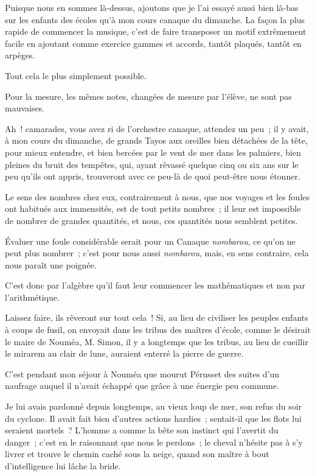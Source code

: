 \documentclass[french,twoside]{book} %
\begin{document}
Puisque nous en sommes là-dessus, ajoutons que je l’ai essayé aussi bien là-bas sur les enfants des écoles qu’à mon cours canaque du dimanche. La façon la plus rapide de commencer la musique, c’est de faire transposer un motif extrêmement facile en ajoutant comme exercice gammes et accords, tantôt plaqués, tantôt en arpèges.\par
Tout cela le plus simplement possible.\par
Pour la mesure, les mêmes notes, changées de mesure par l’élève, ne sont pas mauvaises.\par
Ah ! camarades, vous avez ri de l’orchestre canaque, attendez un peu ; il y avait, à mon cours du dimanche, de grands Tayos aux oreilles bien détachées de la tête, pour mieux entendre, et bien bercées par le vent de mer dans les palmiers, bien pleines du bruit des tempêtes, qui, ayant rêvassé quelque cinq ou six ans sur le peu qu’ils ont appris, trouveront avec ce peu-là de quoi peut-être nous étonner.\par
Le sens des nombres chez eux, contrairement à nous, que nos voyages et les foules ont habitués aux immensités, est de tout petits nombres ; il  leur est impossible de nombrer de grandes quantités, et nous, ces quantités nous semblent petites.\par
Évaluer une foule considérable serait pour un Canaque \emph{nombarou}, ce qu’on ne peut plus nombrer ; c’est pour nous aussi \emph{nombarou}, mais, en sens contraire, cela nous paraît une poignée.\par
C’est donc par l’algèbre qu’il faut leur commencer les mathématiques et non par l’arithmétique.\par
Laissez faire, ils rêveront sur tout cela ! Si, au lieu de civiliser les peuples enfants à coups de fusil, on envoyait dans les tribus des maîtres d’école, comme le désirait le maire de Nouméa, M. Simon, il y a longtemps que les tribus, au lieu de cueillir le mirarem au clair de lune, auraient enterré la pierre de guerre.\par
C’est pendant mon séjour à Nouméa que mourut Pérusset des suites d’un naufrage auquel il n’avait échappé que grâce à une énergie peu commune.\par
Je lui avais pardonné depuis longtemps, au vieux loup de mer, son refus du soir du cyclone. Il avait fait bien d’autres actions hardies ; sentait-il que les flots lui seraient mortels ? L’homme a comme la bête son instinct qui l’avertit du danger ; c’est en le raisonnant que nous le perdons ; le  cheval n’hésite pas à s’y livrer et trouve le chemin caché sous la neige, quand son maître à bout d’intelligence lui lâche la bride.\par
\end{document}
